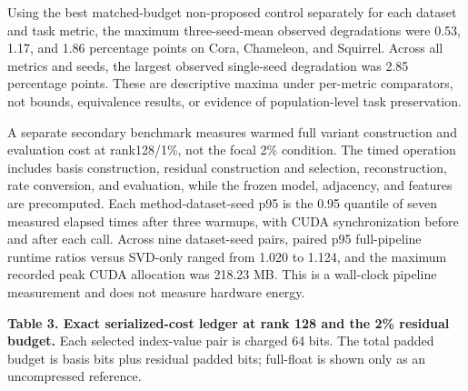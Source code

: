 \documentclass{article}
\begin{document}
Using the best matched-budget non-proposed control separately for each dataset and task metric, the maximum three-seed-mean observed degradations were 0.53, 1.17, and 1.86 percentage points on Cora, Chameleon, and Squirrel. Across all metrics and seeds, the largest observed single-seed degradation was 2.85 percentage points. These are descriptive maxima under per-metric comparators, not bounds, equivalence results, or evidence of population-level task preservation.

A separate secondary benchmark measures warmed full variant construction and evaluation cost at rank128/1\%, not the focal 2\% condition. The timed operation includes basis construction, residual construction and selection, reconstruction, rate conversion, and evaluation, while the frozen model, adjacency, and features are precomputed. Each method-dataset-seed p95 is the 0.95 quantile of seven measured elapsed times after three warmups, with CUDA synchronization before and after each call. Across nine dataset-seed pairs, paired p95 full-pipeline runtime ratios versus SVD-only ranged from 1.020 to 1.124, and the maximum recorded peak CUDA allocation was 218.23 MB. This is a wall-clock pipeline measurement and does not measure hardware energy.

\textbf{Table 3. Exact serialized-cost ledger at rank 128 and the 2\% residual budget.} Each selected index-value pair is charged 64 bits. The total padded budget is basis bits plus residual padded bits; full-float is shown only as an uncompressed reference.

\begin{table}[ht]
\centering
\caption{Comparison of Dataset across Basis bits, Residual target bits, Total padded bits, Selected coefficients}
\label{tab:4}
\end{table}
\end{document}

